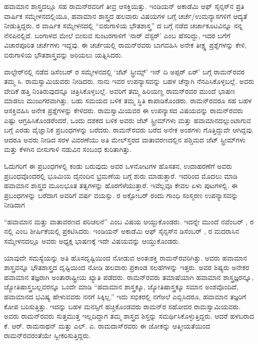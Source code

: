 ಹವಾಮಾನ ಶಾಸ್ತ್ರದಲ್ಲೂ ಸಹ ರಾಮನ್‍ರವರಿಗೆ ತೀವ್ರ ಆಸಕ್ತಿಯಿತ್ತು. ಇಂಡಿಯನ್ ಅಕಾಡೆಮಿ ಆಫ್ ಸೈನ್ಸಸ್‌ನ ಪ್ರತಿ ವಾರ್ಷಿಕ ಸಮ್ಮೇಳನದಲ್ಲಿಯೂ, ಹವಾಮಾನ ಶಾಸ್ತ್ರದ ಹಲವಾರು ವಿಷಯಗಳ ಬಗ್ಗೆ ಚರ್ಚೆ/ಉಮನ್ಯಾಸಗಳಿಗೆ ಆದ್ಯತೆ ನೀಡುತ್ತಿದ್ದರು.  ರ ವಾರ್ಷಿಕ ಸಮ್ಮೇಳನದಲ್ಲಿ “ಬಿರುಗಾಳಿಯ ಭೌತಶಾಸ್ತ್ರ” ದ ಬಗ್ಗೆ ನಡೆದ ಚರ್ಚಾಕೂಟವಿನ್ನೂ ನನ್ನ ನೆನಪಿನಲ್ಲಿದೆ. ಬಂಗಾಳದ ಮೇಲೆ ಬೀಸುವ ಸುಂಟರಗಾಳಿಗೆ ‘ನಾರ್ ವೆಸ್ಟರ್’ ಎಂಬ ಹೆಸರಿದ್ದು, ಇದರ ಬಗೆಗೆ ವಿಚಾರಪೂರಿತ ಚರ್ಚೆಗಳು ಇದ್ದವು. ಈ ಚರ್ಚೆಯಲ್ಲಿ ರಾಮನ್‌ರವರು ಬಾಗವಹಿಸಿ ಅನೇಕ ತೀಕ್ಷ್ಣ ಪ್ರಶ್ನೆಗಳನ್ನು ಕೇಳಿ, ಬಿರುಗಾಳಿಯ ಭೌತಶಾಸ್ತ್ರವನ್ನು ಅರಿಯಲು ಯತ್ನಿಸಿದರು.

ವಾಲ್ಟೇರ್‌ನಲ್ಲಿ ನಡೆದ ಡಿಸೆಂಬರ್  ರ ಸಮ್ಮೇಳನದಲ್ಲಿ ‘ಜೆಟ್ ಸ್ಟ್ರೀಮ್ಸ್’ ಇನ್ ದಿ ಅಪ್ಪರ್ ಏರ್’ ಬಗ್ಗೆ ರಾಮನ್‌ರವರ ತಮ್ಮ ಸಿ. ರಾಮಸ್ವಾಮಿಯವರು ನೀಡಿದರು. ನಾನು ಇವರ ಉಪನ್ಯಾಸವನ್ನು ಬಹಳ ಚೆನ್ನಾಗಿ ನೆನಪಿಸಿಕೊಳ್ಳಬಲ್ಲೆ. ಅವರು ವೇದಿಕೆ ಹತ್ತಿ ನಿಂತಿರುವುದನ್ನೂ ಚಿತ್ರಿಸಿಕೊಳ್ಳಬಲ್ಲೆ. ಅವರಿಗೆ ತಮ್ಮ ಹಿರಿಯಣ್ಣ ರಾಮನ್‌ರವರ ಮುಂದೆ ಭಾಷಣ ಮಾಡಲು ಮುಜುಗರವಾಗಿತ್ತು. ಬಹು ಸಮಯದ ಬಳಿಕ ತಮ್ಮ ಸ್ಥಿತಿ ಕಾಪಾಡಿಕೊಂಡರು. ರಾಮನ್‌ರವರೂ ಸಹ ಬಹಳ ಆಸಕ್ತಿವಹಿಸಿ ಅನೇಕ ಪ್ರಶ್ನೆಗಳನ್ನು ಕೇಳಿದರು. ರಾಮಸ್ವಾಮಿಯವರ ಈ ಉಪನ್ಯಾಸದ ವಿಷಯವನ್ನು ರಾಮನ್‌ರವರು ಎಷ್ಟು ಆಗ್ರಹಿಸಿಕೊಂಡರೆಂದರೆ, ಒಂದು ದಶಕದ ಬಳಿಕ ಅವರು ಜೆಟ್ ಸ್ಟ್ರೀಮ್‌ಗಳು ಮತ್ತು ಹವಾಮಾನದಲ್ಲುಂಟಾಗುವ  ಬಗ್ಗೆ ಎರಡು ವೈಜ್ಞಾನಿಕ ಪ್ರಬಂಧಗಳನ್ನು ಬರೆದರು. ರಾಮನ್‌ರವರು ಬರೆದ ಅನೇಕ ಅಂಶಗಳು ಗೊತ್ತಿದ್ದುವೇ ಆಗಿದ್ದವು. ಆದರೂ ಅವರು ನೀಡಿದ ಸರಳ ವಿವರಣೆಯು ಅತಿ ಮೇಲ್‌ಸ್ತರದ ವಾತಾವರಣದಲ್ಲಿನ ಪಶ್ಚಿಮದ ಜೆಟ್‌ ಸ್ಟ್ರೀಮ್‌ಗಳು ಮತ್ತು ಕೆಳಗಿನ ಬೀಸುಗಾಳಿ ನಡುವಿನ ಸಂಬಂಧ ಕುರಿತಾಗಿತ್ತು.

ಓದುಗರಿಗೆ ಈ ಪ್ರಬಂಧಗಳಲ್ಲಿ ಕಂಡು ಬರುವುದು ಅವರ ಒಳನೋಟಗಳ ಹೊಸತನ, ಉದಾಹರಣೆಗೆ ಅವರು ಪ್ರಬಂಧವೊಂದರಲ್ಲಿ ಭೂಮಿಯ ದೈನಂದಿನ ಭ್ರಮಣೆಯ ಬಗ್ಗೆ ಶುರು ಮಾಡುತ್ತಾರೆ. ಇದರಿಂದ ಮೊದಲು ಮಾಡಿ ಹವಾಮಾನ ಶಾಸ್ತ್ರದ ಮೂಲಭೂತ ತತ್ವಗಳನ್ನು ಹೊರಗೆಳೆಯುತ್ತಾರೆ. ಇವೆಲ್ಲವೂ ಕೇವಲ ಏಳು ಪುಟಗಳಲ್ಲಿ. ಈ ಪ್ರಬಂಧಗಳನ್ನು ಬರೆದಾಗ ಅವರಿಗೆ  ವರ್ಷ ವಯಸ್ಸು. ರ ಅಕ್ಟೋಬರ್  ರಂದು ಗಾಂಧಿ ಸಂಸ್ಮರಣ ಉಪನ್ಯಾಸವನ್ನು ನೀಡಿದಾಗ 

“ಹವಾಮಾನ ಮತ್ತು ವಾತಾವರಣದ ಪರಿಚಲನೆ” ಎಂಬ ವಿಷಯ ಆಯ್ದುಕೊಂಡರು. ಇದನ್ನೇ ಮುಂದೆ ನವೆಂಬರ್ , ರ  ನಲ್ಲಿ  ಎಂಬ ಶೀರ್ಷಿಕೆಯಲ್ಲಿ ಪ್ರಕಟಿಸಿದರು. ಇಂಡಿಯನ್ ಅಕಾಡೆಮಿ ಆಫ್ ಸೈನ್ಸಸ್‍ನ ಡಿಸೆಂಬರ್ ,  ರ ಮದರಾಸಿನ ಸಮ್ಮೇಳನದಲ್ಲೂ ಅವರು ಅಧ್ಯಕ್ಷ ಭಾಷಣಕ್ಕೆ ಇದೇ ವಿಷಯವನ್ನು ಆಯ್ದುಕೊಂಡರು.

ಯಾವುದೇ ಸಮಸ್ಯೆಯನ್ನು ಅತಿ ಹೊಸದೃಷ್ಟಿಯಿಂದ ನೋಡುವ ಅಂತಃಶಕ್ತಿ ರಾಮನ್‌ರವರಿಗಿತ್ತು. ಅವರು ಹವಾಮಾನ ಶಾಸ್ತ್ರವನ್ನೂ ಭೌತಶಾಸ್ತ್ರದ ದೃಷ್ಟಿಯಿಂದ ನೋಡಿ ಹಲವಾರು ಪ್ರಕಾಂಡ ಸಲಹೆಗಳನ್ನು ಇತ್ತರು. ಅವರ ಶಿಷ್ಯರು ಅನೇಕರ ಹವಾಮಾನ ತಜ್ಞರಾಗಿ ಅಂತಾರಾಷ್ಟ್ರೀಯ ಖ್ಯಾತಿ ಪಡೆದರು. ರಾಮನ್‌ರವರು ತಮಾಷೆಯಾಗಿ ಹವಾಮಾನ ಶಾಸ್ತ್ರಜ್ಞರನ್ನೂ, ಜ್ಯೋತಿಷಾಸ್ತ್ರಬಲ್ಲವರನ್ನೂ ಒಂದೇ ಮಾಡಿ “ಹವಾಮಾನ ಶಾಸ್ತ್ರಕ್ಕೂ, ಜ್ಯೋತಿಷಾಸ್ತ್ರಕ್ಕೂ ಸಮಾನ ಅಂಶವೊಂದಿದೆ, ಹವಾಮಾನದ ಭವಿಷ್ಯ ಹೇಳುವವರು ನನಗೆ ಸಿಕ್ಕಿಲ್ಲ.” ಇದು ಸಭಿಕರಲ್ಲಿ ನಗೆಅಲೆ ಎಬ್ಬಿಸಿದರೂ, ಹವಾಮಾನ ತಜ್ಞರಿಗೆ ಕೋಪ ಬರಿಸುತ್ತಿತ್ತು. ಇದನ್ನು ಬಹಳ ಮನಸ್ಸಿಗೆ ಹಚ್ಚಿಕೊಂಡವರು ರಾಮನ್‌ರ ಸಹೋದರ ರಾಮಸ್ವಾಮಿಯವರು. ಅವರು ರಾಮನ್‌ರವರು ಸುತ್ತಮುತ್ತ ಇಲ್ಲದಿದ್ದಾಗ ತಮ್ಮ ಶಾಸ್ತ್ರದ ಶಿಸ್ತನ್ನು ಸಮರ್ಥಿಸಿಕೊಳ್ಳುತ್ತಿದ್ದರು. ಆದರೆ ಹಳಬರಾದ ಕೆ. ಆರ್. ರಾಮನಾಥನ್ ಮತ್ತು ಎಲ್. ಎ. ರಾಮದಾಸ್‌ರವರು ಈ ಜೋಕನ್ನು ಆತ್ಮೀಯತೆಯಿಂದ ರಾಮನ್‌ರವರಂತೆಯೇ ಸ್ವೀಕರಿಸುತ್ತಿದ್ದರು.

